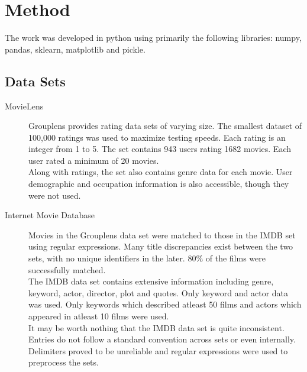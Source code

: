 \documentclass[letterpaper, 10 pt, conference]{ieeeconf}  %
\begin{document}
\section{Method}

The work was developed in python using primarily the following libraries: numpy, pandas, sklearn, matplotlib and pickle.

\subsection{Data Sets}

\begin{description}
  \item[MovieLens]Grouplens provides rating data sets 
  of varying size. The smallest dataset of 100,000 ratings was used to maximize testing speeds. Each rating is an integer from 1 to 5. The set contains 943 users rating 1682 movies. Each user rated a minimum of 20 movies. 
  \\Along with ratings, the set also contains genre data for each movie. User demographic and occupation information is also accessible, though they were not used.
  \item[Internet Movie Database] Movies in the Grouplens data set were matched to those in the IMDB set using regular expressions. Many title discrepancies exist between the two sets, with no unique identifiers in the later. 80\% of the films were successfully matched.
  \\The IMDB data set contains extensive information including genre, keyword, actor, director, plot and quotes. Only keyword and actor data was used. Only keywords which described atleast 50 films and actors which appeared in atleast 10 films were used.
  \\It may be worth nothing that the IMDB data set is quite inconsistent. Entries do not follow a standard convention across sets or even internally. Delimiters proved to be unreliable and regular expressions were used to preprocess the sets.
\end{description}
\end{document}
